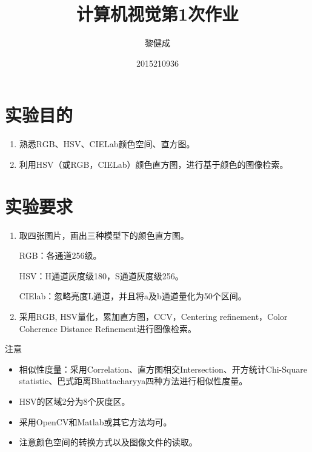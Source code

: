 \documentclass[a4paper, 12pt, UTF8]{article}
\begin{document}
\title{计算机视觉第1次作业}
\author{黎健成}
\date{2015210936}
\maketitle

\section{实验目的}

\begin{enumerate}

\item 熟悉RGB、HSV、CIELab颜色空间、直方图。

\item 利用HSV（或RGB，CIELab）颜色直方图，进行基于颜色的图像检索。

\end{enumerate}


\section{实验要求}

\begin{enumerate}

\item 取四张图片，画出三种模型下的颜色直方图。

RGB：各通道256级。

HSV：H通道灰度级180，S通道灰度级256。

CIElab：忽略亮度L通道，并且将a及b通道量化为50个区间。

\item 采用RGB, HSV量化，累加直方图，CCV，Centering refinement，Color Coherence Distance Refinement进行图像检索。

\end{enumerate}

{\large 注意}

\begin{itemize}

\item 相似性度量：采用Correlation、直方图相交Intersection、开方统计Chi-Square statistic、巴式距离Bhattacharyya四种方法进行相似性度量。

\item HSV的区域2分为8个灰度区。

\item 采用OpenCV和Matlab或其它方法均可。

\item 注意颜色空间的转换方式以及图像文件的读取。

\end{itemize}
\end{document}
